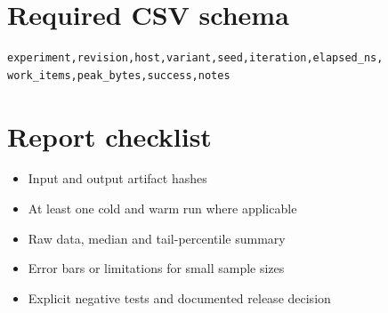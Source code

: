 \documentclass[11pt,letterpaper]{article}
\begin{document}
\section{Required CSV schema}
\begin{verbatim}
experiment,revision,host,variant,seed,iteration,elapsed_ns,
work_items,peak_bytes,success,notes
\end{verbatim}\section{Report checklist}
\begin{itemize}
\item Input and output artifact hashes
\item At least one cold and warm run where applicable
\item Raw data, median and tail-percentile summary
\item Error bars or limitations for small sample sizes
\item Explicit negative tests and documented release decision
\end{itemize}
\end{document}
